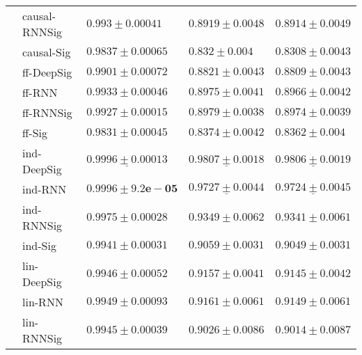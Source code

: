 \begin{tabular}{lllll}
       & causal-RNNSig &                            $ 0.993 \pm 0.00041 $ &                           $ 0.8919 \pm 0.0048 $ &                           $ 0.8914 \pm 0.0049 $ \\
       & causal-Sig &                           $ 0.9837 \pm 0.00065 $ &                             $ 0.832 \pm 0.004 $ &                           $ 0.8308 \pm 0.0043 $ \\
       & ff-DeepSig &                           $ 0.9901 \pm 0.00072 $ &                           $ 0.8821 \pm 0.0043 $ &                           $ 0.8809 \pm 0.0043 $ \\
       & ff-RNN &                           $ 0.9933 \pm 0.00046 $ &                           $ 0.8975 \pm 0.0041 $ &                           $ 0.8966 \pm 0.0042 $ \\
       & ff-RNNSig &                           $ 0.9927 \pm 0.00015 $ &                           $ 0.8979 \pm 0.0038 $ &                           $ 0.8974 \pm 0.0039 $ \\
       & ff-Sig &                           $ 0.9831 \pm 0.00045 $ &                           $ 0.8374 \pm 0.0042 $ &                            $ 0.8362 \pm 0.004 $ \\
       & ind-DeepSig &  $  \mathbf{ \underline{ 0.9996 \pm 0.00013 }} $ &  $  \mathbf{ \underline{ 0.9807 \pm 0.0018 }} $ &  $  \mathbf{ \underline{ 0.9806 \pm 0.0019 }} $ \\
       & ind-RNN &               $  \mathbf{ 0.9996 \pm 9.2e-05 } $ &            $  \underline{ 0.9727 \pm 0.0044 } $ &            $  \underline{ 0.9724 \pm 0.0045 } $ \\
       & ind-RNNSig &                           $ 0.9975 \pm 0.00028 $ &                           $ 0.9349 \pm 0.0062 $ &                           $ 0.9341 \pm 0.0061 $ \\
       & ind-Sig &                           $ 0.9941 \pm 0.00031 $ &                           $ 0.9059 \pm 0.0031 $ &                           $ 0.9049 \pm 0.0031 $ \\
       & lin-DeepSig &                           $ 0.9946 \pm 0.00052 $ &                           $ 0.9157 \pm 0.0041 $ &                           $ 0.9145 \pm 0.0042 $ \\
       & lin-RNN &                           $ 0.9949 \pm 0.00093 $ &                           $ 0.9161 \pm 0.0061 $ &                           $ 0.9149 \pm 0.0061 $ \\
       & lin-RNNSig &                           $ 0.9945 \pm 0.00039 $ &                           $ 0.9026 \pm 0.0086 $ &                           $ 0.9014 \pm 0.0087 $ \\

\end{tabular}

